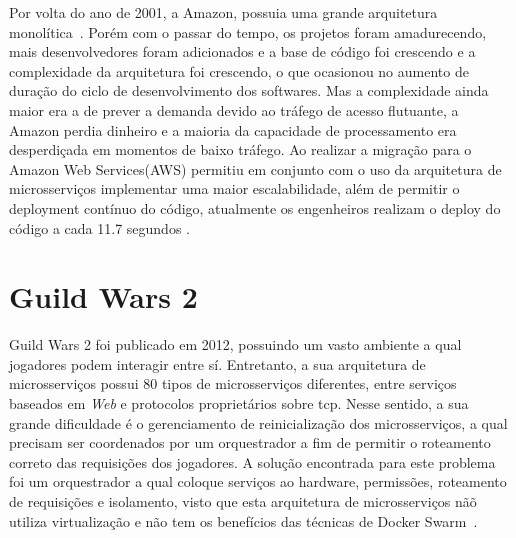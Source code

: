 Por volta do ano de 2001, a Amazon, possuia uma grande arquitetura monolítica~\cite{microservicesAmazon1}. Porém com o passar do tempo, os projetos foram amadurecendo, mais desenvolvedores foram adicionados e a base de código foi crescendo e a complexidade da arquitetura foi crescendo, o que ocasionou no aumento de duração do ciclo de desenvolvimento dos softwares.
Mas a complexidade ainda maior era a de prever a demanda devido ao tráfego de acesso flutuante, a Amazon perdia dinheiro e a maioria da capacidade de processamento era desperdiçada em momentos de baixo tráfego. Ao realizar a migração para o Amazon Web Services(AWS) permitiu em conjunto com o uso da arquitetura de microsserviços implementar uma maior escalabilidade, além de permitir o deployment contínuo do código, atualmente os engenheiros realizam o deploy do código a cada 11.7 segundos \cite{microservicesAmazon2}.

\section{Guild Wars 2}

Guild Wars 2 foi publicado em 2012, possuindo um vasto ambiente a qual jogadores podem interagir entre sí.
%
Entretanto, a sua arquitetura de microsserviços possui 80 tipos de microsserviços diferentes, entre serviços baseados em \textit{Web} e protocolos proprietários sobre \ac{tcp}.
%
Nesse sentido, a sua grande dificuldade é o gerenciamento de reinicialização dos microsserviços, a qual precisam ser coordenados por um orquestrador a fim de permitir o roteamento correto das requisições dos jogadores.
%
A solução encontrada para este problema foi um orquestrador a qual coloque serviços ao hardware, permissões, roteamento de requisições e isolamento, visto que esta arquitetura de microsserviços nãõ utiliza virtualização e não tem os benefícios das técnicas de Docker Swarm~\cite{stephenclarkewillson2017}.
